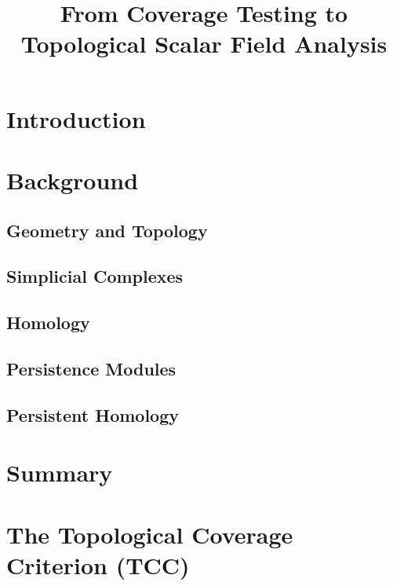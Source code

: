 \documentclass[12pt]{article}
\begin{document}
\title{From Coverage Testing to Topological Scalar Field Analysis}
\maketitle



\section{Introduction}\label{sec:introduction}
  
  

\clearpage
\section{Background}
  \subsection{Geometry and Topology}
    
  \subsection{Simplicial Complexes}\label{sec:complexes}
    
  \subsection{Homology}\label{sec:homology}
    
  \subsection{Persistence Modules}
    
  \subsection{Persistent Homology}
    


\section{Summary}\label{sec:summary}


\section{The Topological Coverage Criterion (TCC)}\label{sec:tcc}



\end{document}
